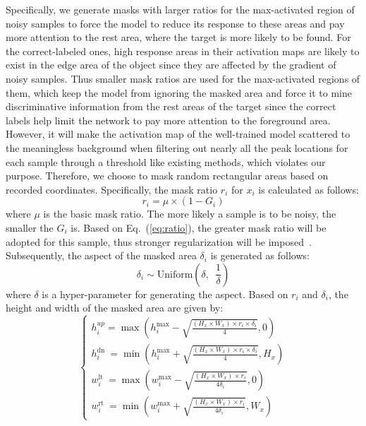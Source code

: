 \documentclass[10pt,twocolumn,letterpaper]{article}
\begin{document}
Specifically, we generate masks with larger ratios for the max-activated region of noisy samples to force the model to reduce its response to these areas and pay more attention to the rest area, where the target is more likely to be found. For the correct-labeled ones, high response areas in their activation maps are likely to exist in the edge area of the object since they are affected by the gradient of noisy samples. Thus smaller mask ratios are used for the max-activated regions of them, which keep the model from ignoring the masked area and force it to mine discriminative information from the rest areas of the target since the correct labels help limit the network to pay more attention to the foreground area. However, it will make the activation map of the well-trained model scattered to the meaningless background when filtering out nearly all the peak locations for each sample through a threshold like existing methods, which violates our purpose. Therefore, we choose to mask random rectangular areas based on recorded coordinates. Specifically, the mask ratio $r_i$ for $x_i$ is calculated as follows:
\begin{equation}
    r_i = \mu\times (1 - G_i)
\label{eq:ratio}
\end{equation}
where $\mu$ is the basic mask ratio. {The more likely a sample is to be noisy, the smaller the $G_i$ is. Based on Eq.~(\ref{eq:ratio}), the greater mask ratio will be adopted for this sample, thus stronger regularization will be imposed~\cite{li2020dividemix}}. Subsequently, the aspect of the masked area $\delta_i$ is generated as follows:
\begin{equation}
    \delta_i \sim \text{Uniform}(\delta, \enspace \frac{1}{\delta})
\end{equation}
where $\delta$ is a hyper-parameter for generating the aspect. Based on $r_i$ and $\delta_i$, the height and width of the masked area are given by:
\begin{equation}
\left\{\begin{array}{c}
h_{i}^{u p}=\max \left(h_{i}^{\max }-\sqrt{\frac{\left(H_{x} \times W_{x}\right) \times r_{i} \times \delta_{i}}{4}}, 0\right) \\
h_{i}^{\text {dn }}=\min \left(h_{i}^{\max }+\sqrt{\frac{\left(H_{x} \times W_{x}\right) \times r_{i} \times \delta_{i}}{4}}, H_{x}\right) \\
w_{i}^{\text {lt }}=\max \left(w_{i}^{\max }-\sqrt{\frac{\left(H_{x} \times W_{x}\right) \times r_{i}}{4 \delta_{i}}}, 0\right) \\
w_{i}^{\text {rt }}=\min \left(w_{i}^{\max }+\sqrt{\frac{\left(H_{x} \times W_{x}\right) \times r_{i}}{4 \delta_{i}}}, W_{x}\right)
\end{array}\right.
\end{equation}
\end{document}
